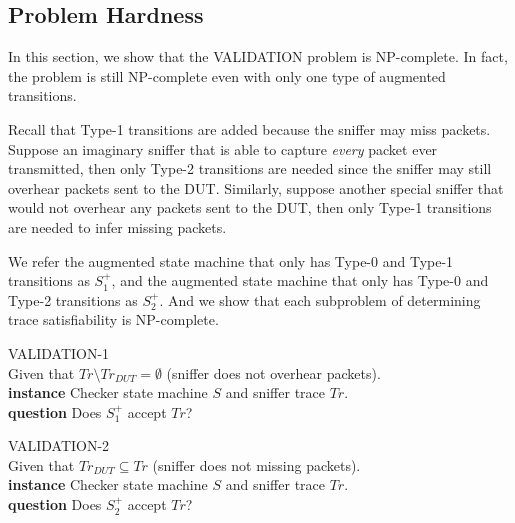 \subsection{Problem Hardness}
\label{subsec:hard}

In this section, we show that the VALIDATION problem is NP-complete. In
fact, the problem is still NP-complete even with only one type of augmented
transitions.

Recall that Type-1 transitions are added because the sniffer may miss packets.
Suppose an imaginary sniffer that is able to capture \textit{every} packet ever
transmitted, then only Type-2 transitions are needed since the sniffer may still
overhear packets sent to the DUT. Similarly, suppose another special sniffer
that would not overhear any packets sent to the DUT, then only Type-1
transitions are needed to infer missing packets.

We refer the augmented state machine that only has Type-0 and Type-1
transitions as $S^+_1$, and the augmented state machine that only has Type-0 and
Type-2 transitions as $S^+_2$. And we show that each subproblem of determining
trace satisfiability is NP-complete.

\begin{problem}
  VALIDATION-1\\
  Given that $Tr\setminus Tr_{DUT}=\emptyset$ (sniffer does not overhear
  packets).\\
  \textbf{instance} Checker state machine $S$ and sniffer trace $Tr$.\\
  \textbf{question} Does $S^+_1$ accept $Tr$?
\end{problem}

\begin{problem}
  VALIDATION-2\\
  Given that $Tr_{DUT} \subseteq Tr$ (sniffer does not missing packets).\\
  \textbf{instance} Checker state machine $S$ and sniffer trace $Tr$.\\
  \textbf{question} Does $S^+_2$ accept $Tr$?
\end{problem}

